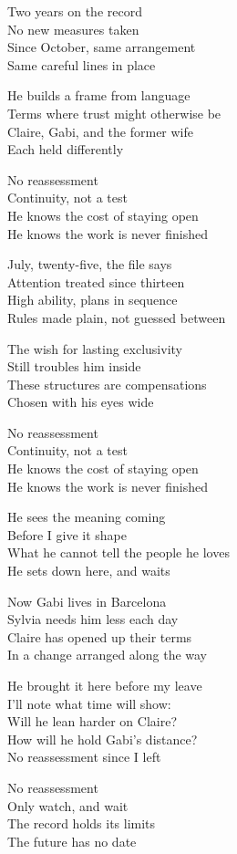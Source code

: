 \begin{lyrics}
Two years on the record\\
No new measures taken\\
Since October, same arrangement\\
Same careful lines in place

He builds a frame from language\\
Terms where trust might otherwise be\\
Claire, Gabi, and the former wife\\
Each held differently

No reassessment\\
Continuity, not a test\\
He knows the cost of staying open\\
He knows the work is never finished

July, twenty-five, the file says\\
Attention treated since thirteen\\
High ability, plans in sequence\\
Rules made plain, not guessed between

The wish for lasting exclusivity\\
Still troubles him inside\\
These structures are compensations\\
Chosen with his eyes wide

No reassessment\\
Continuity, not a test\\
He knows the cost of staying open\\
He knows the work is never finished

He sees the meaning coming\\
Before I give it shape\\
What he cannot tell the people he loves\\
He sets down here, and waits

Now Gabi lives in Barcelona\\
Sylvia needs him less each day\\
Claire has opened up their terms\\
In a change arranged along the way

He brought it here before my leave\\
I’ll note what time will show:\\
Will he lean harder on Claire?\\
How will he hold Gabi’s distance?\\
No reassessment since I left

No reassessment\\
Only watch, and wait\\
The record holds its limits\\
The future has no date
\end{lyrics}

